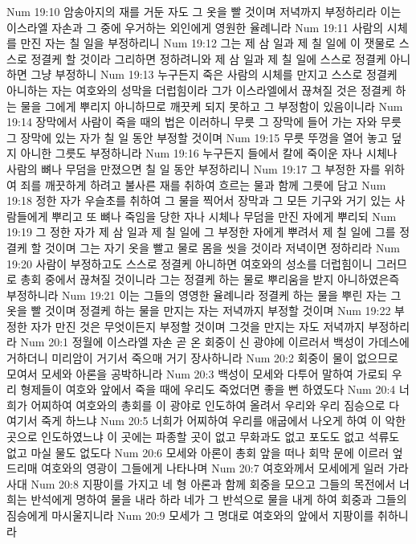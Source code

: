 Num 19:10  암송아지의 재를 거둔 자도 그 옷을 빨 것이며 저녁까지 부정하리라 이는 이스라엘 자손과 그 중에 우거하는 외인에게 영원한 율례니라
Num 19:11  사람의 시체를 만진 자는 칠 일을 부정하리니
Num 19:12  그는 제 삼 일과 제 칠 일에 이 잿물로 스스로 정결케 할 것이라 그리하면 정하려니와 제 삼 일과 제 칠 일에 스스로 정결케 아니하면 그냥 부정하니
Num 19:13  누구든지 죽은 사람의 시체를 만지고 스스로 정결케 아니하는 자는 여호와의 성막을 더럽힘이라 그가 이스라엘에서 끊쳐질 것은 정결케 하는 물을 그에게 뿌리지 아니하므로 깨끗케 되지 못하고 그 부정함이 있음이니라
Num 19:14  장막에서 사람이 죽을 때의 법은 이러하니 무릇 그 장막에 들어 가는 자와 무릇 그 장막에 있는 자가 칠 일 동안 부정할 것이며
Num 19:15  무릇 뚜껑을 열어 놓고 덮지 아니한 그릇도 부정하니라
Num 19:16  누구든지 들에서 칼에 죽이운 자나 시체나 사람의 뼈나 무덤을 만졌으면 칠 일 동안 부정하리니
Num 19:17  그 부정한 자를 위하여 죄를 깨끗하게 하려고 불사른 재를 취하여 흐르는 물과 함께 그릇에 담고
Num 19:18  정한 자가 우슬초를 취하여 그 물을 찍어서 장막과 그 모든 기구와 거기 있는 사람들에게 뿌리고 또 뼈나 죽임을 당한 자나 시체나 무덤을 만진 자에게 뿌리되
Num 19:19  그 정한 자가 제 삼 일과 제 칠 일에 그 부정한 자에게 뿌려서 제 칠 일에 그를 정결케 할 것이며 그는 자기 옷을 빨고 물로 몸을 씻을 것이라 저녁이면 정하리라
Num 19:20  사람이 부정하고도 스스로 정결케 아니하면 여호와의 성소를 더럽힘이니 그러므로 총회 중에서 끊쳐질 것이니라 그는 정결케 하는 물로 뿌리움을 받지 아니하였은즉 부정하니라
Num 19:21  이는 그들의 영영한 율례니라 정결케 하는 물을 뿌린 자는 그 옷을 빨 것이며 정결케 하는 물을 만지는 자는 저녁까지 부정할 것이며
Num 19:22  부정한 자가 만진 것은 무엇이든지 부정할 것이며 그것을 만지는 자도 저녁까지 부정하리라
Num 20:1  정월에 이스라엘 자손 곧 온 회중이 신 광야에 이르러서 백성이 가데스에 거하더니 미리암이 거기서 죽으매 거기 장사하니라
Num 20:2  회중이 물이 없으므로 모여서 모세와 아론을 공박하니라
Num 20:3  백성이 모세와 다투어 말하여 가로되 우리 형제들이 여호와 앞에서 죽을 때에 우리도 죽었더면 좋을 뻔 하였도다
Num 20:4  너희가 어찌하여 여호와의 총회를 이 광야로 인도하여 올려서 우리와 우리 짐승으로 다 여기서 죽게 하느냐
Num 20:5  너희가 어찌하여 우리를 애굽에서 나오게 하여 이 악한 곳으로 인도하였느냐 이 곳에는 파종할 곳이 없고 무화과도 없고 포도도 없고 석류도 없고 마실 물도 없도다
Num 20:6  모세와 아론이 총회 앞을 떠나 회막 문에 이르러 엎드리매 여호와의 영광이 그들에게 나타나며
Num 20:7  여호와께서 모세에게 일러 가라사대
Num 20:8  지팡이를 가지고 네 형 아론과 함께 회중을 모으고 그들의 목전에서 너희는 반석에게 명하여 물을 내라 하라 네가 그 반석으로 물을 내게 하여 회중과 그들의 짐승에게 마시울지니라
Num 20:9  모세가 그 명대로 여호와의 앞에서 지팡이를 취하니라
